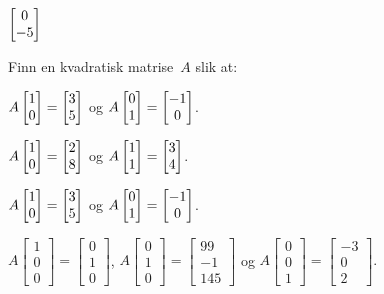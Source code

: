 \begin{losning}
$\vv{0}{-5}$
\end{losning}


\begin{oppgave}
Finn en kvadratisk matrise~$A$ slik at:
\begin{punkt}
$A \vv{1}{0} = \vv{3}{5}$
og
$A \vv{0}{1} = \vv{-1}{0}$.
\end{punkt}
\begin{punkt}
$A \vv{1}{0} = \vv{2}{8}$
og
$A \vv{1}{1} = \vv{3}{4}$.
\end{punkt}
\begin{punkt}
$A \vv{1}{0} = \vv{3}{5}$ 
og
$A \vv{0}{1} = \vv{-1}{0}$.
\end{punkt}
\begin{punkt}
$A \begin{bmatrix}
1\\
0\\
0
\end{bmatrix}
 =  \begin{bmatrix}
0\\
1\\
0
\end{bmatrix} 
 $, $A \begin{bmatrix}
0\\
1\\
0
\end{bmatrix}
 =  \begin{bmatrix}
99\\
-1\\
145
\end{bmatrix} 
$ \newline 
og $A \begin{bmatrix}
0\\
0\\
1
\end{bmatrix}
 =  \begin{bmatrix}
-3\\
0\\
2
\end{bmatrix}.
 $
\end{punkt}


\end{oppgave}
